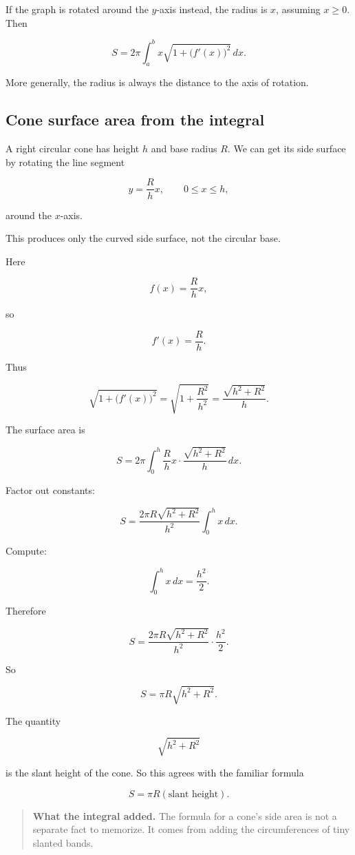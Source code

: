 If the graph is rotated around the \(y\)-axis instead, the radius is \(x\), assuming
\(x\ge0\).  Then

\[
\boxed{
S=2\pi\int_a^b x\sqrt{1+\bigl(f'(x)\bigr)^2}\,dx.
}
\]

More generally, the radius is always the distance to the axis of rotation.

\subsection{Cone surface area from the integral}
\label{subsec:cone-surface-area-integral}

A right circular cone has height \(h\) and base radius \(R\).  We can get its side surface
by rotating the line segment

\[
y=\frac{R}{h}x,
\qquad 0\le x\le h,
\]

around the \(x\)-axis.

This produces only the curved side surface, not the circular base.

Here

\[
f(x)=\frac{R}{h}x,
\]

so

\[
f'(x)=\frac{R}{h}.
\]

Thus

\[
\sqrt{1+\bigl(f'(x)\bigr)^2}
=
\sqrt{1+\frac{R^2}{h^2}}
=
\frac{\sqrt{h^2+R^2}}{h}.
\]

The surface area is

\[
S
=
2\pi\int_0^h
\frac{R}{h}x
\cdot
\frac{\sqrt{h^2+R^2}}{h}
\,dx.
\]

Factor out constants:

\[
S
=
\frac{2\pi R\sqrt{h^2+R^2}}{h^2}
\int_0^h x\,dx.
\]

Compute:

\[
\int_0^h x\,dx=\frac{h^2}{2}.
\]

Therefore

\[
S
=
\frac{2\pi R\sqrt{h^2+R^2}}{h^2}\cdot\frac{h^2}{2}.
\]

So

\[
\boxed{
S=\pi R\sqrt{h^2+R^2}.
}
\]

The quantity

\[
\sqrt{h^2+R^2}
\]

is the slant height of the cone.  So this agrees with the familiar formula

\[
S=\pi R(\text{slant height}).
\]

\begin{quote}
\textbf{What the integral added.}
The formula for a cone's side area is not a separate fact to memorize.  It comes from
adding the circumferences of tiny slanted bands.
\end{quote}

